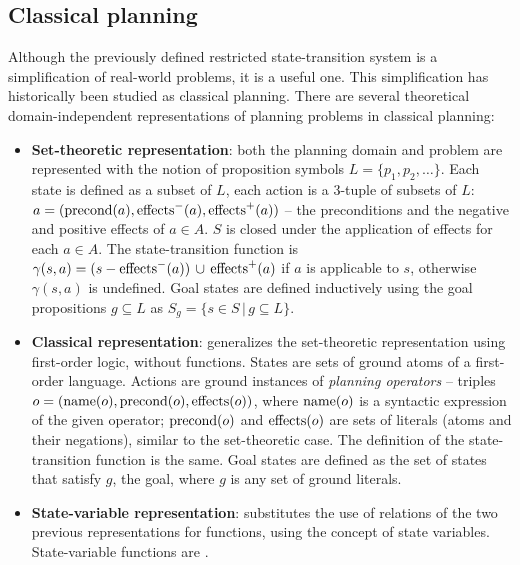 
\subsection{Classical planning}

Although the previously defined restricted state-transition system is a simplification of real-world
problems, it is a useful one. 
This simplification has historically been studied as classical planning.
There are several theoretical domain-independent representations
of planning problems in classical planning: \cite[Chapter 2]{Ghallab2004}

\begin{itemize}

\item \textbf{Set-theoretic representation}: both the planning domain and problem are represented with the notion
of proposition symbols $L = \{p_1, p_2, \ldots\}$. Each state is defined as a subset of $L$, each action
is a 3-tuple of subsets of $L$: $a = (\operatorname{\textrm{precond}}(a), \operatorname{\textrm{effects}}^-(a), \operatorname{\textrm{effects}}^+(a))$ -- the preconditions and
the negative and positive effects of $a \in A$. $S$ is closed under the application of effects
for each $a \in A$. The state-transition function is $\gamma(s, a) = (s - \operatorname{\textrm{effects}}^-(a)) \,\cup\,
\operatorname{\textrm{effects}}^+(a)$ if $a$ is applicable to $s$,
otherwise $\gamma(s, a)$ is undefined. Goal states are defined inductively using the goal propositions
$g \subseteq L$ as $S_g = \{s \in S \,|\, g \subseteq L\}$.
 
\item \textbf{Classical representation}:
generalizes the set-theoretic representation using first-order logic, without functions.
States are sets of ground atoms of a first-order language.
Actions are ground instances of \textit{planning operators}
-- triples $o = (\operatorname{\textrm{name}}(o), \operatorname{\textrm{precond}}(o), \operatorname{\textrm{effects}}(o))$,
where $\operatorname{\textrm{name}}(o)$ is a syntactic expression of the given operator;
$\operatorname{\textrm{precond}}(o)$ and $\operatorname{\textrm{effects}}(o)$ are sets of literals (atoms and their negations),
similar to the set-theoretic case.
The definition of the state-transition function is the same.
Goal states are defined as the set of states that satisfy $g$, the goal, where $g$ is any set
of ground literals.


\item \textbf{State-variable representation}: substitutes the use of relations of the two previous representations for functions, using the concept of state variables. State-variable functions are .

\end{itemize}

